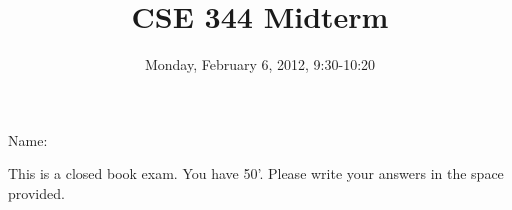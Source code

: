 \documentclass[addpoints,answers,12pt]{exam}
\begin{document}
\title{CSE 344  Midterm}
\author{}
\date{Monday, February 6, 2012, 9:30-10:20}

\maketitle

\begin{center}
{
\vspace{1cm}

{\LARGE Name:\enspace\makebox[3in]{\hrulefill}}

\vfill

This is a closed book exam.  You have 50'.  Please write your answers
in the space provided.

\vfill

\gradetable

\vfill

}
\end{center}

\newpage
\end{document}
